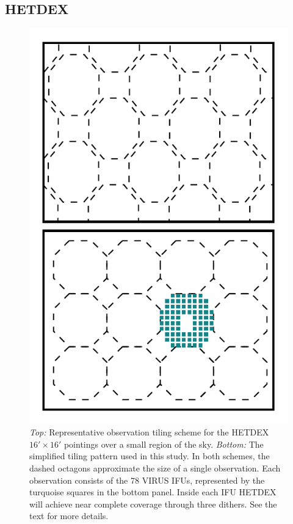 \documentclass[fleqn,usenatbib]{mnras}
\begin{document}
\subsection{HETDEX}\label{sec: hetdex}
\begin{figure}
\includegraphics[width=\columnwidth]{figures/pointings.pdf} 
	\caption[HETDEX pointing strategy.]{\emph{Top:} Representative observation tiling scheme for the HETDEX $16' \times 16'$ pointings over a small region of the sky. \emph{Bottom:} The simplified tiling pattern used in this study. In both schemes, the dashed octagons approximate the size of a single observation. Each observation consists of the 78 VIRUS IFUs, represented by the turquoise squares in the bottom panel. Inside each IFU HETDEX will achieve near complete coverage through three dithers. See the text for more details.} 
	\label{fig: ifu layout} 
\end{figure}
\end{document}
